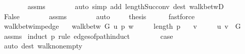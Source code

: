 \begin{isabellebody}
\ \ \ \ \ \ \isamarkupfalse%
\ assms{\isacharparenleft}{\kern0pt}{}{\isacharparenright}{\kern0pt}\isanewline
\ \ \ \ \ \ \isamarkupfalse%
\ {\isacharparenleft}{\kern0pt}auto\ simp\ add{\isacharcolon}{\kern0pt}\ length{\isacharunderscore}{\kern0pt}Suc{\isacharunderscore}{\kern0pt}conv\ dest{\isacharcolon}{\kern0pt}\ walk{\isacharunderscore}{\kern0pt}betwD{\isacharparenright}{\kern0pt}\isanewline
\ \ \ \ \isamarkupfalse%
\ False\isanewline
\ \ \ \ \ \ \isamarkupfalse%
\ assms{\isacharparenleft}{\kern0pt}{}{\isacharparenright}{\kern0pt}\isanewline
\ \ \ \ \ \ \isamarkupfalse%
\ auto\ \isacommand{{\isacharbraceright}{\kern0pt}}\isamarkupfalse%
\isanewline
\ \ \isamarkupfalse%
\ {\isacharquery}{\kern0pt}thesis\isanewline
\ \ \ \ \isamarkupfalse%
\ fastforce\isanewline
{}\isamarkupfalse%
%
\endisatagproof
{\isafoldproof}%
%
\isadelimproof
\isanewline
%
\endisadelimproof
%
\isadeliminvisible
\isanewline
%
\endisadeliminvisible
%
\isataginvisible
{}\isamarkupfalse%
\ walk{\isacharunderscore}{\kern0pt}betw{\isacharunderscore}{\kern0pt}imp{\isacharunderscore}{\kern0pt}edge{\isacharcolon}{\kern0pt}\isanewline
\ \ \ {\isachardoublequoteopen}walk{\isacharunderscore}{\kern0pt}betw\ G\ u\ p\ w{\isachardoublequoteclose}\isanewline
\ \ \ {\isachardoublequoteopen}{}\ {\isasymle}\ length\ p{\isachardoublequoteclose}\isanewline
\ \ \ v\ \isanewline
\ \ \ \ {\isachardoublequoteopen}{\isacharbraceleft}{\kern0pt}u{\isacharcomma}{\kern0pt}\ v{\isacharbraceright}{\kern0pt}\ {\isasymin}\ G{\isachardoublequoteclose}%
\endisataginvisible
{\isafoldinvisible}%
%
\isadeliminvisible
\isanewline
%
\endisadeliminvisible
%
\isadelimproof
\ \ %
\endisadelimproof
%
\isatagproof
{}\isamarkupfalse%
\ assms\isanewline
{}\isamarkupfalse%
\ {\isacharparenleft}{\kern0pt}induct\ p\ rule{\isacharcolon}{\kern0pt}\ edges{\isacharunderscore}{\kern0pt}of{\isacharunderscore}{\kern0pt}path{\isachardot}{\kern0pt}induct{\isacharparenright}{\kern0pt}\isanewline
\ \ \isamarkupfalse%
\ {}\isanewline
\ \ \isamarkupfalse%
\ {\isacharquery}{\kern0pt}case\isanewline
\ \ \ \ \isamarkupfalse%
\ {\isacharparenleft}{\kern0pt}auto\ dest{\isacharcolon}{\kern0pt}\ walk{\isacharunderscore}{\kern0pt}nonempty{\isacharparenright}{\kern0pt}\isanewline
{}\isamarkupfalse%

\end{isabellebody}
